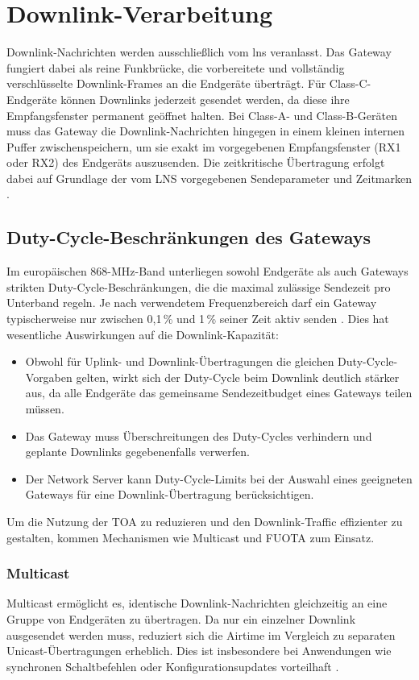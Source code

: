 \section{Downlink-Verarbeitung}

	Downlink-Nachrichten werden ausschlie{\ss}lich vom \ac{lns} veranlasst. Das Gateway fungiert dabei als reine Funkbrücke, die vorbereitete und vollständig verschlüsselte Downlink-Frames an die Endgeräte überträgt. Für Class-C-Endgeräte können Downlinks jederzeit gesendet werden, da diese ihre Empfangsfenster permanent geöffnet halten. Bei Class-A- und Class-B-Geräten muss das Gateway die Downlink-Nachrichten hingegen in einem kleinen internen Puffer zwischenspeichern, um sie exakt im vorgegebenen Empfangsfenster (RX1 oder RX2) des Endgeräts auszusenden. Die zeitkritische Übertragung erfolgt dabei auf Grundlage der vom LNS vorgegebenen Sendeparameter und Zeitmarken  \cite{LoRaAlliance:2020b}.

\subsection{Duty-Cycle-Beschränkungen des Gateways}
	Im europäischen 868-MHz-Band unterliegen sowohl Endgeräte als auch Gateways strikten Duty-Cycle-Beschränkungen, die die maximal zulässige Sendezeit pro Unterband regeln. Je nach verwendetem Frequenzbereich darf ein Gateway typischerweise nur zwischen 0{,}1\,\% und 1\,\% seiner Zeit aktiv senden \cite{ETSI:2018b}. Dies hat wesentliche Auswirkungen auf die Downlink-Kapazität:
\begin{itemize}
	\item Obwohl für Uplink- und Downlink-Übertragungen die gleichen Duty-Cycle-Vorgaben gelten, wirkt sich der Duty-Cycle beim Downlink deutlich stärker aus, da alle Endgeräte das gemeinsame Sendezeitbudget eines Gateways teilen müssen.
	\item Das Gateway muss Überschreitungen des Duty-Cycles verhindern und geplante Downlinks gegebenenfalls verwerfen.
	\item Der Network Server kann Duty-Cycle-Limits bei der Auswahl eines geeigneten Gateways für eine Downlink-Übertragung berücksichtigen.
\end{itemize}

	Um die Nutzung der \ac{TOA} zu reduzieren und den Downlink-Traffic effizienter zu gestalten, kommen Mechanismen wie Multicast und \ac{FUOTA} zum Einsatz.

\subsubsection{Multicast}
	Multicast ermöglicht es, identische Downlink-Nachrichten gleichzeitig an eine Gruppe von Endgeräten zu übertragen. Da nur ein einzelner Downlink ausgesendet werden muss, reduziert sich die Airtime im Vergleich zu separaten Unicast-Übertragungen erheblich. Dies ist insbesondere bei Anwendungen wie synchronen Schaltbefehlen oder Konfigurationsupdates vorteilhaft \cite{USMB:2022}.

